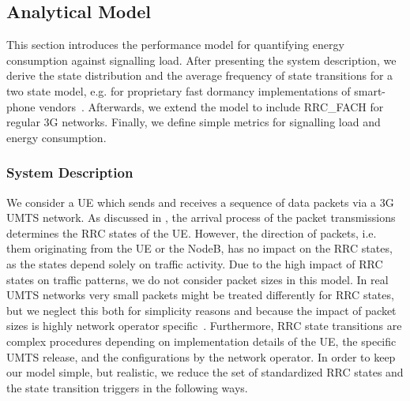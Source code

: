 \subsection{Analytical Model}\label{sec:network:performance_model:analytical_model}
This section introduces the performance model for quantifying energy consumption against signalling load.
After presenting the system description, we derive the state distribution and the average frequency of state transitions for a two state model, e.g. for proprietary fast dormancy implementations of smart-phone vendors~\cite{NSN2011}. 
Afterwards, we extend the model to include \gls{RRC_FACH} for regular \gls{3G} networks.
Finally, we define simple metrics for signalling load and energy consumption.

\newcommand{\PacketIAT}{A}

\subsubsection*{System Description}\label{sec:network:performance_model:analytical_model:system_description}
We consider a \gls{UE} which sends and receives a sequence of data packets via a \gls{3G} \gls{UMTS} network.
As discussed in , the arrival process of the packet transmissions determines the \gls{RRC} states of the \gls{UE}.
However, the direction of packets, i.e. them originating from the \gls{UE} or the \gls{NodeB}, has no impact on the \gls{RRC} states, as the states depend solely on traffic activity.
Due to the high impact of \gls{RRC} states on traffic patterns, we do not consider packet sizes in this model.
In real \gls{UMTS} networks very small packets might be treated differently for \gls{RRC} states, but we neglect this both for simplicity reasons and because the impact of packet sizes is highly network operator specific~\cite{Qian2010a}.
Furthermore, \gls{RRC} state transitions are complex procedures depending on implementation details of the \gls{UE}, the specific \gls{UMTS} release, and the configurations by the network operator.
In order to keep our model simple, but realistic, we reduce the set of standardized \gls{RRC} states and the state transition triggers in the following ways. 

